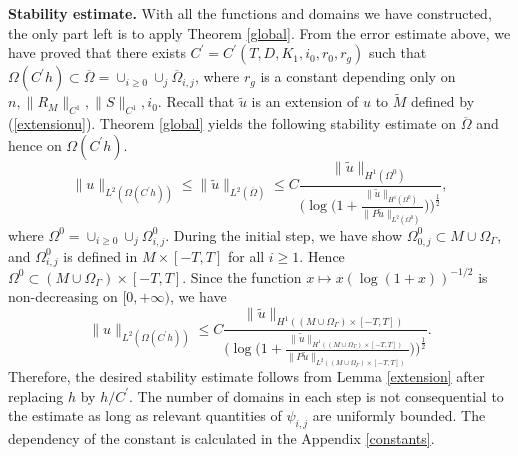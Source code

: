 \documentclass[11pt,letterpaper]{amsart}
\numberwithin{equation}{section}
\theoremstyle{definition}
\theoremstyle{plain}
\theoremstyle{definition}
\theoremstyle{plain}
\theoremstyle{definition}
\theoremstyle{plain}
\begin{document}
\medskip
\noindent\textbf{Stability estimate.} With all the functions and domains we have constructed, the only part left is to apply Theorem \ref{global}. From the error estimate above, we have proved that there exists $C^{\prime}=C^{\prime}(T,D,K_1,i_0,r_0,r_g)$ such that $\Omega(C^{\prime}h)\subset \overline{\Omega}=\cup_{i\geqslant 0}\cup_{j} \overline{\Omega}_{i,j}$, where $r_g$ is a constant depending only on $n,\|R_M\|_{C^1},\|S\|_{C^1},i_0$. Recall that $\widetilde{u}$ is an extension of $u$ to $\widetilde{M}$ defined by (\ref{extensionu}). 
Theorem \ref{global} yields the following stability estimate on $\overline{\Omega}$ and hence on $\Omega(C^{\prime}h)$.
$$\|u\|_{L^2(\Omega(C^{\prime}h))}\leqslant \|\widetilde{u}\|_{L^2(\overline{\Omega})}\leqslant C \frac{\|\widetilde{u}\|_{H^1(\Omega^0)}}{\Big(\log \big(1+\frac{\|\widetilde{u}\|_{H^1(\Omega^0)}}{\|P\widetilde{u}\|_{L^2(\Omega^0)}}\big)\Big)^{\frac{1}{2}}}, $$
where $\Omega^0=\cup_{i\geqslant 0}\cup_{j} \Omega_{i,j}^0$. During the initial step, we have show $\Omega^0_{0,j}\subset M\cup \Omega_{\Gamma}$, and $\Omega^0_{i,j}$ is defined in $M\times [-T,T]$ for all $i\geqslant 1$. Hence $\Omega^0\subset (M\cup \Omega_{\Gamma})\times [-T,T]$. Since the function $x\mapsto x(\log (1+x))^{-1/2}$ is non-decreasing on $[0,+\infty)$, we have
$$\|u\|_{L^2(\Omega(C^{\prime}h))}\leqslant C \frac{\|\widetilde{u}\|_{H^1((M\cup\Omega_{\Gamma})\times[-T,T])}}{\Big(\log \big(1+\frac{\|\widetilde{u}\|_{H^1((M\cup\Omega_{\Gamma})\times [-T,T])}}{\|P\widetilde{u}\|_{L^2((M\cup\Omega_{\Gamma})\times[-T,T])}}\big)\Big)^{\frac{1}{2}}}.$$
Therefore, the desired stability estimate follows from Lemma \ref{extension} after replacing $h$ by $h/C^{\prime}$. 
The number of domains in each step is not consequential to the estimate as long as relevant quantities of $\psi_{i,j}$ are uniformly bounded. The dependency of the constant is calculated in the Appendix \ref{constants}. 
\end{document}
